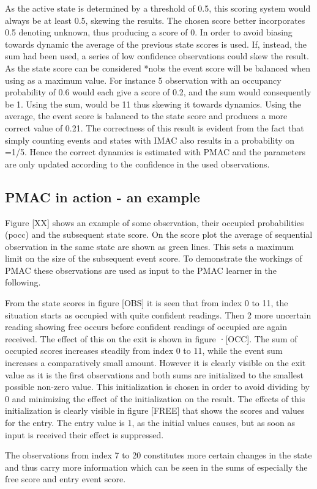 As the active state is determined by a threshold of 0.5, this scoring system would always be at least 0.5, skewing the results. The chosen score better incorporates 0.5 denoting unknown, thus producing a score of 0. 
In order to avoid biasing towards dynamic the average of the previous state scores is used. If, instead, the sum had been used, a series of low confidence observations could skew the result. As the state score can be considered *nobs the event score will be balanced when using as a maximum value. For instance 5 observation with an occupancy probability of 0.6 would each give a score of 0.2, and the sum would consequently be 1. Using the sum,  would be 11  thus skewing it towards dynamics. Using the average, the event score is balanced to the state score and produces a more correct value of 0.21. The correctness of this result is evident from the fact that simply counting events and states with IMAC also results in a probability on =1/5. Hence the correct dynamics is estimated with PMAC and the parameters are only updated according to the confidence in the used observations.

\subsection{PMAC in action - an example}
Figure [XX] shows an example of some observation, their occupied probabilities (pocc) and the subsequent state score. On the score plot the average of sequential observation in the same state are shown as green lines. This sets a maximum limit on the size of the subsequent event score. To demonstrate the workings of PMAC these observations are used as input to the PMAC learner in the following. 


From the state scores in figure [OBS] it is seen that from index 0 to 11, the situation starts as occupied with quite confident readings. Then 2 more uncertain reading showing free occurs before confident readings of occupied are again received. The effect of this on the exit is shown in figure ·[OCC]. The sum of occupied scores increases steadily from index 0 to 11, while the event sum increases a comparatively small amount. However it is clearly visible on the exit  value as it is the first observations and both sums are initialized to the smallest possible non-zero value. This initialization is chosen in order to avoid dividing by 0 and minimizing the effect of the initialization on the result. The effects of this initialization is clearly visible in figure [FREE] that shows the scores and values for the entry. The entry value is 1, as the initial values causes, but as soon as input is received their effect is suppressed.


The observations from index 7 to 20 constitutes more certain changes in the state and thus carry more information which can be seen in the sums of especially the free score and entry event score. 

